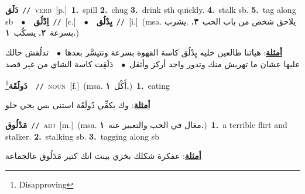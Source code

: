 \documentclass[10pt,a4paper,twoside]{article} %
\begin{document}
\begin{multicols}{2}
{\setlength\topsep{0pt}\textbf{\foreignlanguage{arabic}{دَلَق}}\ {\color{gray}\texttt{//}\color{black}}\ \textsc{verb}\ [p.]\ \textbf{1.}~spill  \textbf{2.}~chug  \textbf{3.}~drink sth quickly.  \textbf{4.}~stalk sb.  \textbf{5.}~tag along sb\ \ $\bullet$\ \ \setlength\topsep{0pt}\textbf{\foreignlanguage{arabic}{اِدْلُق}}\ {\color{gray}\texttt{//}\color{black}}\ [c.]\ \ $\bullet$\ \ \setlength\topsep{0pt}\textbf{\foreignlanguage{arabic}{يِدْلُق}}\ {\color{gray}\texttt{//}\color{black}}\ [i.]\ \color{gray}(msa. \foreignlanguage{arabic}{يلاحق شخص من باب الحب}~\foreignlanguage{arabic}{\textbf{٣.}}  .\foreignlanguage{arabic}{يشرب بسرعة}~\foreignlanguage{arabic}{\textbf{٢.}}  \foreignlanguage{arabic}{يسكُب}~\foreignlanguage{arabic}{\textbf{١.}})\color{black}\  \begin{flushright}\color{gray}\foreignlanguage{arabic}{\textbf{\underline{\foreignlanguage{arabic}{أمثلة}}}: هياتنا طالعين خليه يِدْلُق كاسة القهوة بسرعة ونتيسَّر بعدها\ $\bullet$\ \  تدلُقش حالك عليها عشان ما تهربش منك وتدور واحد أركز وأثقل\ $\bullet$\ \  دَلَقِت كاسة الشاي من غير قصد}\end{flushright}\color{black}} \vspace{2mm}

{\setlength\topsep{0pt}\textbf{\foreignlanguage{arabic}{دَولَقَة}}\footnote{Disapproving}\ \ {\color{gray}\texttt{//}\color{black}}\ \textsc{noun}\ [f.]\ \color{gray}(msa. \foreignlanguage{arabic}{أَكْل}~\foreignlanguage{arabic}{\textbf{١.}})\color{black}\ \textbf{1.}~eating\  \begin{flushright}\color{gray}\foreignlanguage{arabic}{\textbf{\underline{\foreignlanguage{arabic}{أمثلة}}}: وك بكفِّي دُولَقَة استنى بس يجي حلو}\end{flushright}\color{black}} \vspace{2mm}

{\setlength\topsep{0pt}\textbf{\foreignlanguage{arabic}{مَدْلُوق}}\ {\color{gray}\texttt{//}\color{black}}\ \textsc{adj}\ [m.]\ \color{gray}(msa. \foreignlanguage{arabic}{مغال في الحب والتعبير عنه}~\foreignlanguage{arabic}{\textbf{١.}})\color{black}\ \textbf{1.}~a terrible flirt and stalker.  \textbf{2.}~stalking sb.  \textbf{3.}~tagging along sb\  \begin{flushright}\color{gray}\foreignlanguage{arabic}{\textbf{\underline{\foreignlanguage{arabic}{أمثلة}}}: عفكرة شكلك بخزي بينت انك كتير مَدَلُوق عالجماعة}\end{flushright}\color{black}} \vspace{2mm}


\end{multicols}
\end{document}
